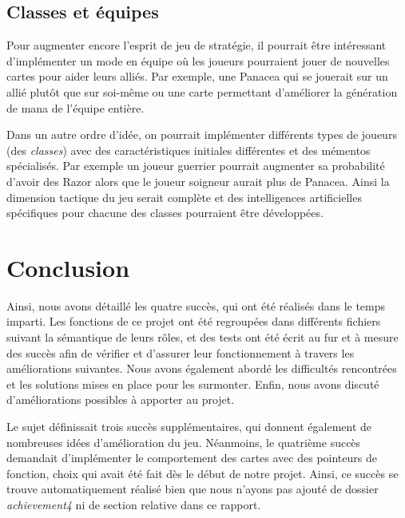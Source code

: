 \documentclass[12pt]{article}
\begin{document}
\subsection{Classes et équipes}
Pour augmenter encore l'esprit de jeu de stratégie, il pourrait être intéressant d'implémenter un mode en équipe où les joueurs pourraient jouer de nouvelles cartes pour aider leurs alliés.
Par exemple, une Panacea qui se jouerait sur un allié plutôt que sur soi-même ou une carte permettant d'améliorer la génération de mana de l'équipe entière.

Dans un autre ordre d'idée, on pourrait implémenter différents types de joueurs (des \textit{classes}) avec des caractéristiques initiales différentes et des mémentos spécialisés.
Par exemple un joueur guerrier pourrait augmenter sa probabilité d'avoir des Razor alors que le joueur soigneur aurait plus de Panacea.
Ainsi la dimension tactique du jeu serait complète et des intelligences artificielles spécifiques pour chacune des classes pourraient être développées.

\section{Conclusion}

Ainsi, nous avons détaillé les quatre succès, qui ont été réalisés dans le temps imparti. Les fonctions de ce projet ont été regroupées dans différents fichiers suivant la sémantique de leurs rôles, et des tests ont été écrit au fur et à mesure des succès afin de vérifier et d'assurer leur fonctionnement à travers les améliorations suivantes. Nous avons également abordé les difficultés rencontrées et les solutions mises en place pour les surmonter. Enfin, nous avons discuté d'améliorations possibles à apporter au projet.

Le sujet définissait trois succès supplémentaires, qui donnent également de nombreuses idées d'amélioration du jeu. Néanmoins, le quatrième succès demandait d'implémenter le comportement des cartes avec des pointeurs de fonction, choix qui avait été fait dès le début de notre projet. Ainsi, ce succès se trouve automatiquement réalisé bien que nous n'ayons pas ajouté de dossier \textit{achievement4} ni de section relative dans ce rapport.
\end{document}
